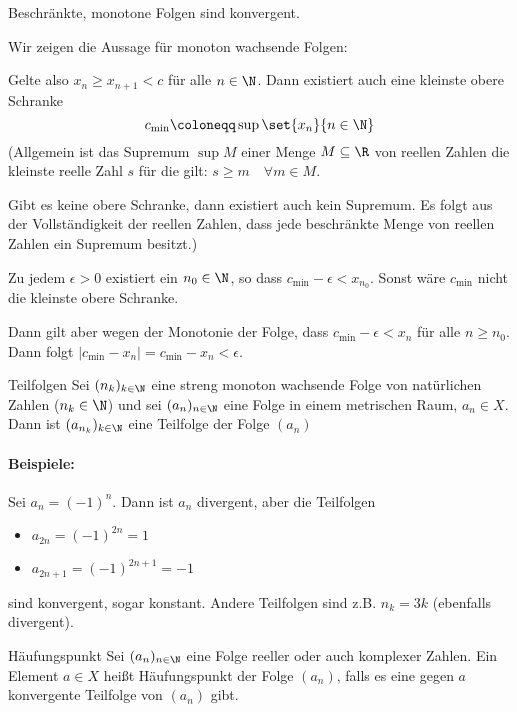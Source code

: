 \begin{satz}{}
	Beschränkte, monotone Folgen sind konvergent.
\end{satz}
\beweis
Wir zeigen die Aussage für monoton wachsende Folgen:

Gelte also $x_n\geq x_{n+1}<c$ für alle $n\in\N$. Dann existiert auch eine kleinste obere Schranke
\begin{equation*}
	c_{\text{min}}\coloneqq \sup\set{x_n}{n\in\N}
\end{equation*}
(Allgemein ist das Supremum $\sup M$ einer Menge $M\subseteq\R$ von reellen Zahlen die kleinste reelle Zahl $s$ für die gilt: $s\geq m\quad\forall m\in M$.

Gibt es keine obere Schranke, dann existiert auch kein Supremum. Es folgt aus der Vollständigkeit der reellen Zahlen, dass jede beschränkte Menge von reellen Zahlen ein Supremum besitzt.)

\par\medskip

Zu jedem $\epsilon>0$ existiert ein $n_0\in\N$, so dass $c_{\text{min}}-\epsilon<x_{n_0}$. Sonst wäre $c_{\text{min}}$ nicht die kleinste obere Schranke.

Dann gilt aber wegen der Monotonie der Folge, dass $c_{\text{min}}-\epsilon<x_n$ für alle $n\geq n_0$. Dann folgt $|c_{\text{min}}-x_n|=c_{\text{min}}-x_n<\epsilon$.


\begin{definition}{Teilfolgen}
	Sei $(n_k)_{k\in\N}$ eine streng monoton wachsende Folge von natürlichen Zahlen ($n_k\in\N$) und sei $(a_n)_{n\in\N}$ eine Folge in einem metrischen Raum, $a_n\in X$. Dann ist $(a_{n_k})_{k\in\N}$ eine Teilfolge der Folge $(a_n)$
\end{definition}
\paragraph{Beispiele:}
Sei $a_n=(-1)^n$. Dann ist $a_n$ divergent, aber die Teilfolgen
\begin{itemize}
	\item $a_{2n}=(-1)^{2n}=1$
	\item $a_{2n+1}=(-1)^{2n+1}=-1$
\end{itemize}
sind konvergent, sogar konstant. Andere Teilfolgen sind z.B. $n_k=3k$ (ebenfalls divergent).

\begin{definition}{Häufungspunkt}
	Sei $(a_n)_{n\in\N}$ eine Folge reeller oder auch komplexer Zahlen. Ein Element $a\in X$ heißt Häufungspunkt der Folge $(a_n)$, falls es eine gegen $a$ konvergente Teilfolge von $(a_n)$ gibt.
\end{definition}
